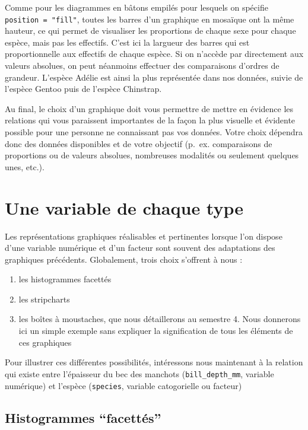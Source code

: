 \documentclass[
  a4paper,
  DIV=11,
  numbers=noendperiod,
  oneside]{scrreprt}
\providecommand{\tightlist}{%
  \setlength{\itemsep}{0pt}\setlength{\parskip}{0pt}}\usepackage{longtable,booktabs,array}
\begin{document}
Comme pour les diagrammes en bâtons empilés pour lesquels on spécifie
\texttt{position\ =\ "fill"}, toutes les barres d'un graphique en
mosaïque ont la même hauteur, ce qui permet de visualiser les
proportions de chaque sexe pour chaque espèce, mais pas les effectifs.
C'est ici la largueur des barres qui est proportionnelle aux effectifs
de chaque espèce. Si on n'accède par directement aux valeurs absolues,
on peut néanmoins effectuer des comparaisons d'ordres de grandeur.
L'espèce Adélie est ainsi la plus représentée dans nos données, suivie
de l'espèce Gentoo puis de l'espèce Chinstrap.

Au final, le choix d'un graphique doit vous permettre de mettre en
évidence les relations qui vous paraissent importantes de la façon la
plus visuelle et évidente possible pour une personne ne connaissant pas
vos données. Votre choix dépendra donc des données disponibles et de
votre objectif (p.~ex. comparaisons de proportions ou de valeurs
absolues, nombreuses modalités ou seulement quelques unes, etc.).

\section{Une variable de chaque type}\label{une-variable-de-chaque-type}

Les représentations graphiques réalisables et pertinentes lorsque l'on
dispose d'une variable numérique et d'un facteur sont souvent des
adaptations des graphiques précédents. Globalement, trois choix
s'offrent à nous :

\begin{enumerate}
\def\labelenumi{\arabic{enumi}.}
\tightlist
\item
  les histogrammes facettés
\item
  les stripcharts
\item
  les boîtes à moustaches, que nous détaillerons au semestre 4. Nous
  donnerons ici un simple exemple sans expliquer la signification de
  tous les éléments de ces graphiques
\end{enumerate}

Pour illustrer ces différentes possibilités, intéressons nous maintenant
à la relation qui existe entre l'épaisseur du bec des manchots
(\texttt{bill\_depth\_mm}, variable numérique) et l'espèce
(\texttt{species}, variable catogorielle ou facteur)

\subsection{Histogrammes ``facettés''}\label{sec-factorhisto}
\end{document}
